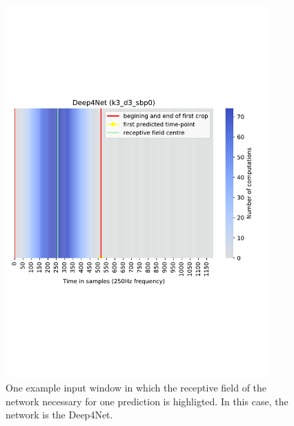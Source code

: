\lipsum

\begin{figure}
    \centering
    \begin{minipage}{0.45\textwidth}
        \centering
        \includegraphics[width=0.9\textwidth]{img/ch3/deep4net-receptive-field} %
        \caption{One example input window in which the receptive field of the network necessary for one prediction is highligted. In this case, the network is the Deep4Net.}
    \end{minipage}\hfill
    \begin{minipage}{0.45\textwidth}
        \centering

\end{minipage}
\end{figure}

